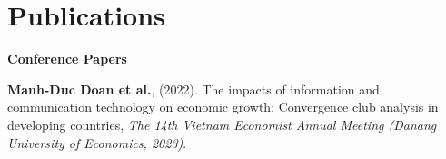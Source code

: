 \section{\sc Publications}
{\bf Conference Papers}
\vspace*{.05in}
\begin{etaremune}[]
\item
  {\bf Manh-Duc Doan et al.},
  (2022).
  {The impacts of information and communication technology on economic growth: Convergence club analysis in developing countries},
  {\it The 14th Vietnam Economist Annual Meeting (Danang University of Economics, 2023)}.
\end{etaremune}


